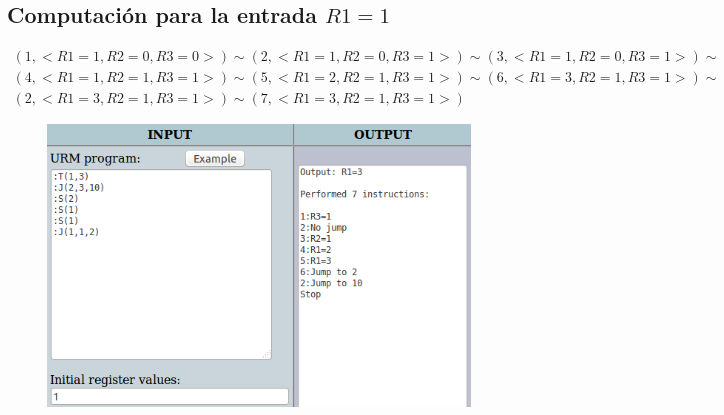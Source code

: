 	\subsection{Computación para la entrada $R1=1$}
	\begin{equation*}\begin{gathered}
	(1, <R1=1, R2=0, R3=0>) \sim (2, <R1=1, R2=0, R3=1>) \sim (3, <R1=1, R2=0, R3=1>) \sim\\
	(4, <R1=1, R2=1, R3=1>) \sim (5, <R1=2, R2=1, R3=1>) \sim (6, <R1=3, R2=1, R3=1>) \sim\\
	(2, <R1=3, R2=1, R3=1>) \sim (7, <R1=3, R2=1, R3=1>)
	\end{gathered}\end{equation*}
	\begin{figure}[H]
  		\centering
  		\includegraphics[scale=0.5]{images/81.png}
  	\end{figure}
